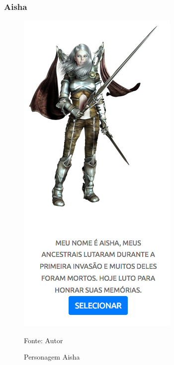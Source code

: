 \subsubsection{Aisha}
\begin{figure}[h]
	\centering
	\includegraphics[keepaspectratio=true,scale=0.6]{figuras/aisha.png}
	\caption{Personagem Aisha}
	Fonte: Autor
	\label{aisha}
\end{figure}

\clearpage

